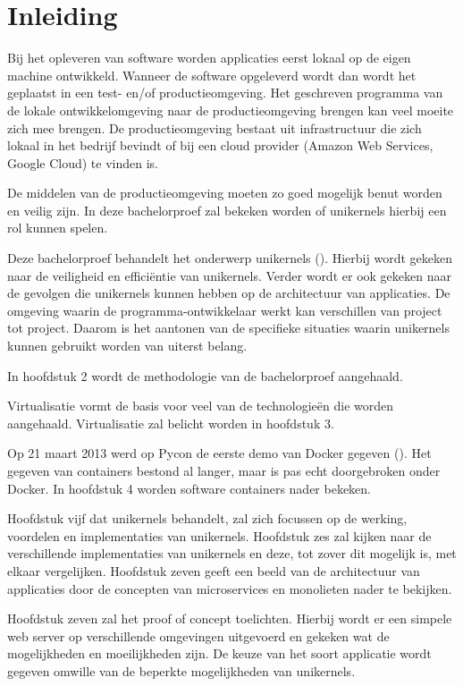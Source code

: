 \chapter{Inleiding}
\label{ch:inleiding}

Bij het opleveren van software worden applicaties eerst lokaal op de eigen machine ontwikkeld. Wanneer de software opgeleverd wordt dan wordt het geplaatst in een test- en/of productieomgeving. Het geschreven programma van de lokale ontwikkelomgeving naar de productieomgeving brengen kan veel moeite zich mee brengen. De productieomgeving bestaat uit infrastructuur die zich lokaal in het bedrijf bevindt of bij een cloud provider (Amazon Web Services, Google Cloud) te vinden is.

De middelen van de productieomgeving moeten zo goed mogelijk benut worden en veilig zijn. In deze bachelorproef zal bekeken worden of unikernels hierbij een rol kunnen spelen.

Deze bachelorproef behandelt het onderwerp unikernels (\cite{mao_performance_2012}). Hierbij wordt gekeken naar de veiligheid en efficiëntie van unikernels. Verder wordt er ook gekeken naar de gevolgen die unikernels kunnen hebben op de architectuur van applicaties. De omgeving waarin de programma-ontwikkelaar werkt kan verschillen van project tot project. Daarom is het aantonen van de specifieke situaties waarin unikernels kunnen gebruikt worden van uiterst belang.

In hoofdstuk 2 wordt de methodologie van de bachelorproef aangehaald.

Virtualisatie vormt de basis voor veel van de technologieën die worden aangehaald. Virtualisatie zal belicht worden in hoofdstuk 3.

Op 21 maart 2013 werd op Pycon de eerste demo van Docker gegeven (\cite{hykes_future_2013}). Het gegeven van containers bestond al langer, maar is pas echt doorgebroken onder Docker. In hoofdstuk 4 worden software containers nader bekeken.

Hoofdstuk vijf dat unikernels behandelt, zal zich focussen op de werking, voordelen en implementaties van unikernels.
Hoofdstuk zes zal kijken naar de verschillende implementaties van unikernels en deze, tot zover dit mogelijk is, met elkaar vergelijken.
Hoofdstuk zeven geeft een beeld van de architectuur van applicaties door de concepten van microservices en monolieten nader te bekijken.

Hoofdstuk zeven zal het proof of concept toelichten. Hierbij wordt er een simpele web server op verschillende omgevingen uitgevoerd en gekeken wat de mogelijkheden en moeilijkheden zijn. De keuze van het soort applicatie wordt gegeven omwille van de beperkte mogelijkheden van unikernels.

